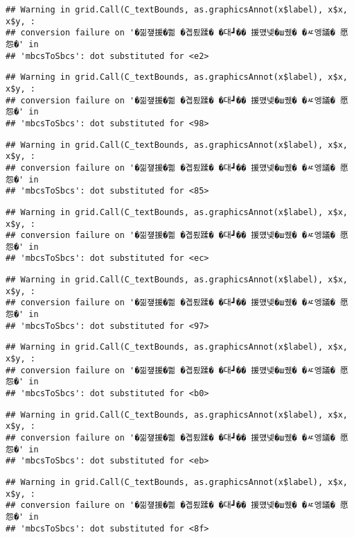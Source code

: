 \documentclass[
]{article}
\begin{document}
\begin{verbatim}
## Warning in grid.Call(C_textBounds, as.graphicsAnnot(x$label), x$x, x$y, :
## conversion failure on '�낆쟾援�쁾 �곕룄蹂� �대┛�� 援먰넻�ш퀬� �ㅼ엥議� 愿怨�' in
## 'mbcsToSbcs': dot substituted for <e2>
\end{verbatim}

\begin{verbatim}
## Warning in grid.Call(C_textBounds, as.graphicsAnnot(x$label), x$x, x$y, :
## conversion failure on '�낆쟾援�쁾 �곕룄蹂� �대┛�� 援먰넻�ш퀬� �ㅼ엥議� 愿怨�' in
## 'mbcsToSbcs': dot substituted for <98>
\end{verbatim}

\begin{verbatim}
## Warning in grid.Call(C_textBounds, as.graphicsAnnot(x$label), x$x, x$y, :
## conversion failure on '�낆쟾援�쁾 �곕룄蹂� �대┛�� 援먰넻�ш퀬� �ㅼ엥議� 愿怨�' in
## 'mbcsToSbcs': dot substituted for <85>
\end{verbatim}

\begin{verbatim}
## Warning in grid.Call(C_textBounds, as.graphicsAnnot(x$label), x$x, x$y, :
## conversion failure on '�낆쟾援�쁾 �곕룄蹂� �대┛�� 援먰넻�ш퀬� �ㅼ엥議� 愿怨�' in
## 'mbcsToSbcs': dot substituted for <ec>
\end{verbatim}

\begin{verbatim}
## Warning in grid.Call(C_textBounds, as.graphicsAnnot(x$label), x$x, x$y, :
## conversion failure on '�낆쟾援�쁾 �곕룄蹂� �대┛�� 援먰넻�ш퀬� �ㅼ엥議� 愿怨�' in
## 'mbcsToSbcs': dot substituted for <97>
\end{verbatim}

\begin{verbatim}
## Warning in grid.Call(C_textBounds, as.graphicsAnnot(x$label), x$x, x$y, :
## conversion failure on '�낆쟾援�쁾 �곕룄蹂� �대┛�� 援먰넻�ш퀬� �ㅼ엥議� 愿怨�' in
## 'mbcsToSbcs': dot substituted for <b0>
\end{verbatim}

\begin{verbatim}
## Warning in grid.Call(C_textBounds, as.graphicsAnnot(x$label), x$x, x$y, :
## conversion failure on '�낆쟾援�쁾 �곕룄蹂� �대┛�� 援먰넻�ш퀬� �ㅼ엥議� 愿怨�' in
## 'mbcsToSbcs': dot substituted for <eb>
\end{verbatim}

\begin{verbatim}
## Warning in grid.Call(C_textBounds, as.graphicsAnnot(x$label), x$x, x$y, :
## conversion failure on '�낆쟾援�쁾 �곕룄蹂� �대┛�� 援먰넻�ш퀬� �ㅼ엥議� 愿怨�' in
## 'mbcsToSbcs': dot substituted for <8f>
\end{verbatim}
\end{document}
